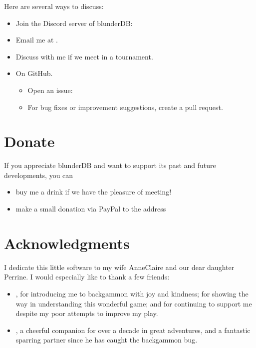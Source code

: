 \documentclass[letterpaper,10pt,english]{sphinxmanual}
\begin{document}
\sphinxAtStartPar
Here are several ways to discuss:
\begin{itemize}
\item {} 
\sphinxAtStartPar
Join the Discord server of blunderDB: 

\item {} 
\sphinxAtStartPar
Email me at .

\item {} 
\sphinxAtStartPar
Discuss with me if we meet in a tournament.

\item {} 
\sphinxAtStartPar
On GitHub.
\begin{itemize}
\item {} 
\sphinxAtStartPar
Open an issue: 

\item {} 
\sphinxAtStartPar
For bug fixes or improvement suggestions, create a pull request.

\end{itemize}

\end{itemize}


\chapter{Donate}
\label{\detokenize{index:faire-un-don}}
\sphinxAtStartPar
If you appreciate blunderDB and want to support its past and future developments, you can
\begin{itemize}
\item {} 
\sphinxAtStartPar
buy me a drink if we have the pleasure of meeting!

\item {} 
\sphinxAtStartPar
make a small donation via PayPal to the address 

\end{itemize}


\chapter{Acknowledgments}
\label{\detokenize{index:remerciements}}
\sphinxAtStartPar
I dedicate this little software to my wife Anne\sphinxhyphen{}Claire and our dear daughter Perrine. I would especially like to thank a few friends:
\begin{itemize}
\item {} 
\sphinxAtStartPar
{}, for introducing me to backgammon with joy and kindness; for showing the way in understanding this wonderful game; and for continuing to support me despite my poor attempts to improve my play.

\item {} 
\sphinxAtStartPar
{}, a cheerful companion for over a decade in great adventures, and a fantastic sparring partner since he has caught the backgammon bug.

\end{itemize}



\renewcommand{\indexname}{Index}
\printindex
\end{document}
